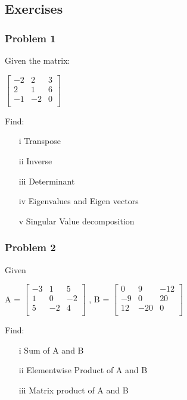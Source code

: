 \documentclass[14pt,compress]{beamer}
\begin{document}
\subsection{Exercises}

\begin{frame}[fragile]
\frametitle{Problem 1}
Given the matrix:\\
\begin{center}
$\begin{bmatrix}
-2 & 2 & 3\\
 2 & 1 & 6\\
-1 &-2 & 0\\
\end{bmatrix}$
\end{center}
Find:
\begin{itemize}
  \item[i] Transpose
  \item[ii]Inverse
  \item[iii]Determinant
  \item[iv] Eigenvalues and Eigen vectors
  \item[v] Singular Value decomposition
\end{itemize}
\end{frame}

\begin{frame}[fragile]
\frametitle{Problem 2}
Given 
\begin{center}
A = 
$\begin{bmatrix}
-3 & 1 & 5 \\
1 & 0 & -2 \\
5 & -2 & 4 \\
\end{bmatrix}$
, B = 
$\begin{bmatrix}
0 & 9 & -12 \\
-9 & 0 & 20 \\
12 & -20 & 0 \\
\end{bmatrix}$
\end{center}
Find:
\begin{itemize}
  \item[i] Sum of A and B
  \item[ii]Elementwise Product of A and B
  \item[iii] Matrix product of A and B
\end{itemize}
\end{frame}
\end{document}
